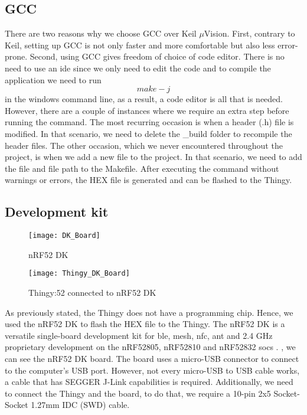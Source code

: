 \subsection{GCC}
There are two reasons why we choose GCC over Keil $\mu${Vision}. First, contrary to Keil, setting up GCC is not only faster and more comfortable but also less error-prone. Second, using GCC gives freedom of choice of code editor. There is no need to use an \gls{ide} since we only need to edit the code and to compile the application we need to run
\begin{equation*}
	make -j
\end{equation*}
in the windows command line, as a result, a code editor is all that is needed. However, there are a couple of instances where we require an extra step before running the command. The most recurring occasion is when a header (.h) file is modified. In that scenario, we need to delete the \_build folder to recompile the header files. The other occasion, which we never encountered throughout the project, is when we add a new file to the project. In that scenario, we need to add the file and file path to the Makefile. After executing the command without warnings or errors, the HEX file is generated and can be flashed to the Thingy.


\subsection{Development kit}\label{sc:dk}
\begin{figure}[hbt!]
	\centering
	\texttt{[image: DK\_Board]}
	\caption{nRF52 DK}
	\label{fig:dk_board}
\end{figure}
\begin{figure}[hbt!]
	\centering
	\texttt{[image: Thingy\_DK\_Board]}
	\caption{Thingy:52 connected to nRF52 DK}
	\label{fig:thingy_dk_board}
\end{figure}
As previously stated, the Thingy does not have a programming chip. Hence, we used the nRF52 DK to flash the HEX file to the Thingy. The nRF52 DK is a versatile single-board development kit for \gls{ble}, \bt mesh, \gls{nfc}, \gls{ant} and 2.4 GHz proprietary development on the nRF52805, nRF52810 and nRF52832 \gls{soc}s \cite{dkboard}. , we can see the nRF52 DK board. The board uses a micro-USB connector to connect to the computer's USB port. However, not every micro-USB to USB cable works, a cable that has SEGGER J-Link capabilities is required. Additionally, we need to connect the Thingy and the board, to do that, we require a 10-pin 2x5 Socket-Socket 1.27mm IDC (SWD) cable.

